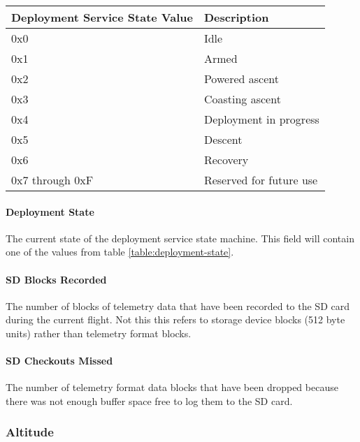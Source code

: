 \begin{table*}[htb]
    \centering
    \begin{tabular}{@{}ll@{}}
        \toprule
        Deployment Service State Value & Description             \\
        \midrule
        0x0                            & Idle                    \\
        0x1                            & Armed                   \\
        0x2                            & Powered ascent          \\
        0x3                            & Coasting ascent         \\
        0x4                            & Deployment in progress  \\
        0x5                            & Descent                 \\
        0x6                            & Recovery                \\
        0x7 through 0xF                & Reserved for future use \\
        \bottomrule
    \end{tabular}
    \caption{Deployment Service States}
    \label{table:deployment-state}
\end{table*}

\paragraph{Deployment State}
The current state of the deployment service state machine. This field will contain one of the values from table
\ref{table:deployment-state}.

\paragraph{SD Blocks Recorded}
The number of blocks of telemetry data that have been recorded to the SD card during the current flight. Not this this
refers to storage device blocks (512 byte units) rather than telemetry format blocks.

\paragraph{SD Checkouts Missed}
The number of telemetry format data blocks that have been dropped because there was not enough buffer space free to log
them to the SD card.

\subsubsection{Altitude}

